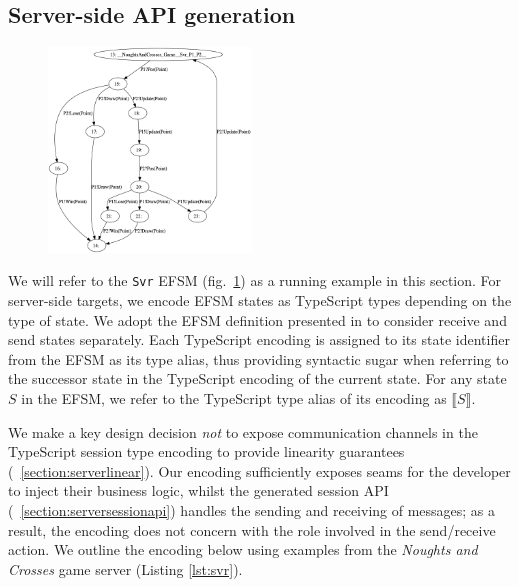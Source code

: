 \documentclass[submission,copyright,creativecommons]{eptcs}
\newcommand{\sectionref}[1]{\textsection~\ref{#1}}
\begin{document}
\subsection{Server-side API generation}
\label{section:server}

\begin{figure}
  \begin{center}
    \includegraphics[width=0.48\textwidth]{figures/efsm_svr.png}
  \end{center}

  \label{fig:efsmsvr}
\end{figure}


We will refer to the \texttt{Svr} EFSM (fig.~\ref{fig:efsmsvr}) as a
running example in this section. For server-side targets, we encode
EFSM states as TypeScript types depending on the type of state. We
adopt the EFSM definition presented in \cite{Hybrid2016} to consider
receive and send states separately. Each TypeScript encoding is
assigned to its state identifier from the EFSM as its type alias, thus providing syntactic sugar when referring to the successor state in the TypeScript encoding of the current state. For any state $S$ in the EFSM, we refer to the TypeScript type alias of its encoding as $\llbracket S \rrbracket$. 

We make a key design decision \textit{not} to expose communication channels in the TypeScript session type encoding to provide linearity guarantees (\sectionref{section:serverlinear}). Our encoding sufficiently exposes seams for the developer to inject their business logic, whilst the generated session API (\sectionref{section:serversessionapi}) handles the sending and receiving of messages; as a result, the encoding does not concern with the role involved in the send/receive action. We outline the encoding below using examples from the \textit{Noughts and Crosses} game server (Listing \ref{lst:svr}).
\end{document}
